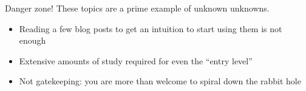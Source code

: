 \begin{frame}{Danger zone!}
  These topics are a prime example of unknown unknowns.
  \begin{itemize}[<+(1)->]
    \item Reading a few blog posts to get an intuition to start using them is not enough
    \item Extensive amounts of study required for even the \enquote{entry level}
    \item Not gatekeeping:
    you are more than welcome to spiral down the rabbit hole
  \end{itemize}
\end{frame}


